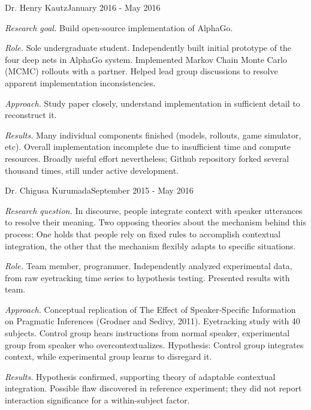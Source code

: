 \documentclass[10pt]{article}
\begin{document}
		{Dr. Henry Kautz}{January 2016 - May 2016}
		{\begin{itemize-noindent}
			\item{\textit{Research goal.} Build open-source implementation of AlphaGo.}
			\item{\textit{Role.} Sole undergraduate student. Independently built initial prototype of the four deep nets in AlphaGo system. Implemented Markov Chain Monte Carlo (MCMC) rollouts with a partner. Helped lead group discussions to resolve apparent implementation inconsistencies.}
			\item{\textit{Approach.} Study paper closely, understand implementation in sufficient detail to reconstruct it.}
			\item{\textit{Results.} Many individual components finished (models, rollouts, game simulator, etc). Overall implementation incomplete due to insufficient time and compute resources. Broadly useful effort nevertheless; Github repository forked several thousand times, still under active development.}
		\end{itemize-noindent}}

		{Dr. Chigusa Kurumada}{September 2015 - May 2016}
		{\begin{itemize-noindent}
			\item{\textit{Research question.} In discourse, people integrate context with speaker utterances to resolve their meaning. Two opposing theories about the mechanism behind this process: One holds that people rely on fixed rules to accomplish contextual integration, the other that the mechanism flexibly adapts to specific situations.}
			\item{\textit{Role.} Team member, programmer. Independently analyzed experimental data, from raw eyetracking time series to hypothesis testing. Presented results with team.}
			\item{\textit{Approach.} Conceptual replication of The Effect of Speaker-Specific Information on Pragmatic Inferences (Grodner and Sedivy, 2011). Eyetracking study with 40 subjects. Control group hears instructions from normal speaker, experimental group from speaker who overcontextualizes. Hypothesis: Control group integrates context, while experimental group learns to disregard it.}
			\item{\textit{Results.} Hypothesis confirmed, supporting theory of adaptable contextual integration. Possible flaw discovered in reference experiment; they did not report interaction significance for a within-subject factor.}
		\end{itemize-noindent}}
\end{document}
